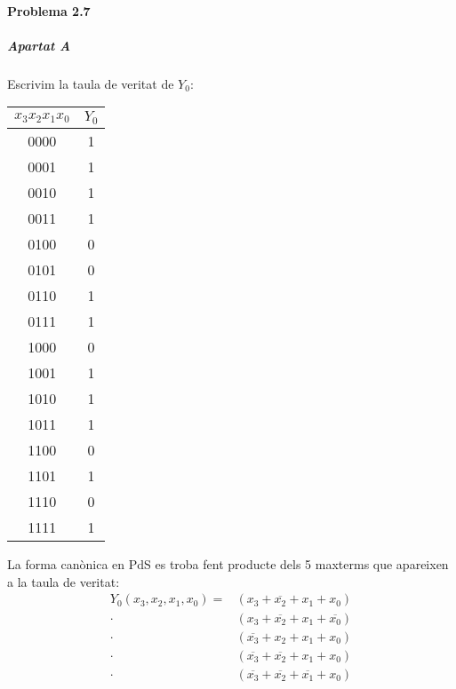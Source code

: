 



\page
\paragraph{Problema 2.7} \hspace{0em}

\vspace{1em}


\subparagraph{Apartat A}

Escrivim la taula de veritat de $Y_0$:

\begin{center} \begin{tabular}{cc}
$x_3x_2x_1x_0$ & $Y_0$ \\
\hline
0000 & 1 \\
0001 & 1 \\
0010 & 1 \\
0011 & 1 \\
0100 & 0 \\
0101 & 0 \\
0110 & 1 \\
0111 & 1 \\
1000 & 0 \\
1001 & 1 \\
1010 & 1 \\
1011 & 1 \\
1100 & 0 \\
1101 & 1 \\
1110 & 0 \\
1111 & 1
\end{tabular} \end{center}

La forma canònica en PdS es troba fent producte dels 5 maxterms que apareixen a la taula de veritat:
%
\begin{align*}
  Y_0(x_3,x_2,x_1,x_0) =&
    \left( x_3 + \overline{x_2} + x_1 + x_0 \right) \\ \cdot&
    \left( x_3 + \overline{x_2} + x_1 + \overline{x_0} \right) \\ \cdot&
    \left( \overline{x_3} + x_2 + x_1 + x_0 \right) \\ \cdot&
    \left( \overline{x_3} + \overline{x_2} + x_1 + x_0 \right) \\ \cdot&
    \left( \overline{x_3} + \overline{x_2} + \overline{x_1} + x_0 \right)
\end{align*}


